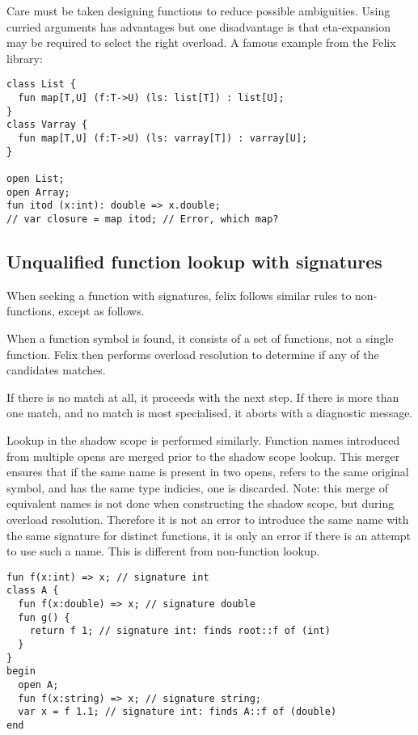 \documentclass[oneside]{book}
\begin{document}
Care must be taken designing functions to reduce
possible ambiguities. Using curried arguments has advantages
but one disadvantage is that eta-expansion may be required
to select the right overload. A famous example from the 
Felix library:

\begin{verbatim}
class List {
  fun map[T,U] (f:T->U) (ls: list[T]) : list[U];
}
class Varray {
  fun map[T,U] (f:T->U) (ls: varray[T]) : varray[U];
}

open List;
open Array;
fun itod (x:int): double => x.double;
// var closure = map itod; // Error, which map?
\end{verbatim}


\subsection{Unqualified function lookup with signatures}
When seeking a function with signatures, 
felix follows similar rules to non-functions, except as follows. 

When a function symbol is found, it consists of a set of functions,
not a single function. Felix then performs overload
resolution to determine if any of the candidates matches.

If there is no match at all, it proceeds with the next step.
If there is more than one match, and no match is most specialised,
it aborts with a diagnostic message.

Lookup in the shadow scope is performed similarly.
Function names introduced from multiple opens are merged
prior to the shadow scope lookup. This merger ensures that
if the same name is present in two opens, refers to the same
original symbol, and has the same type indicies, one is discarded.
Note: this merge of equivalent names is not done when constructing
the shadow scope, but during overload resolution. Therefore it
is not an error to introduce the same name with the same signature
for distinct functions, it is only an error if there is an attempt
to use such a name. This is different from non-function lookup.

\begin{verbatim}
fun f(x:int) => x; // signature int
class A {
  fun f(x:double) => x; // signature double
  fun g() {
    return f 1; // signature int: finds root::f of (int)
  }
}
begin 
  open A;
  fun f(x:string) => x; // signature string;
  var x = f 1.1; // signature int: finds A::f of (double)
end
\end{verbatim}
\end{document}
